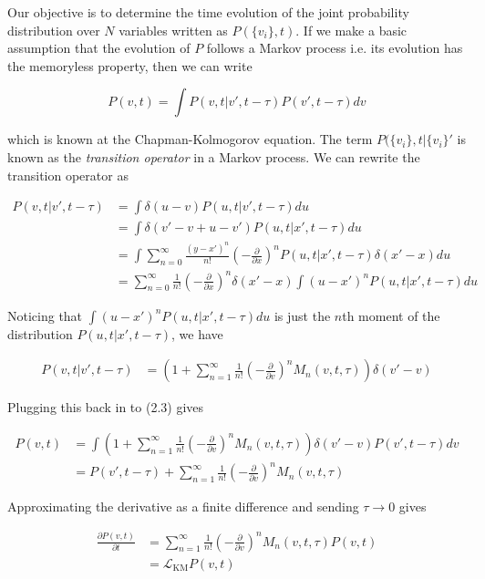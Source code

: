 \documentclass{ucetd}
\begin{document}
Our objective is to determine the time evolution of the joint probability distribution over $N$ variables written as $P(\{v_{i}\}, t)$. If we make a basic assumption that the evolution of $P$ follows a Markov process i.e. its evolution has the memoryless property, then we can write

\begin{equation}
P(v, t) = \int P(v, t | v', t-\tau)P(v', t-\tau)dv
\end{equation} 

which is known at the Chapman-Kolmogorov equation. The term $P(\{v_{i}\}, t | \{v_{i}\}'$ is known as the \emph{transition operator} in a Markov process. We can rewrite the transition operator as

\begin{align*}
P(v,t | v',t-\tau) &= \int \delta(u-v)P(u, t | v', t-\tau)du\\
&= \int \delta(v'-v+u-v')P(u, t | x', t-\tau)du\\
&= \int \sum_{n=0}^{\infty} \frac{(y-x')^{n}}{n!}\left(-\frac{\partial}{\partial x}\right)^{n}P(u, t | x', t-\tau)\delta(x'-x)du\\
&= \sum_{n=0}^{\infty} \frac{1}{n!}\left(-\frac{\partial}{\partial x}\right)^{n}
\delta(x'-x)\int(u-x')^{n}P(u, t | x', t-\tau)du
\end{align*} 

Noticing that $\int(u-x')^{n}P(u, t | x', t-\tau)du$ is just the $n$th moment of the distribution $P(u, t | x', t-\tau)$, we have 

\begin{align}
P(v,t | v',t-\tau) &= \left(1 + \sum_{n=1}^{\infty} \frac{1}{n!}\left(-\frac{\partial}{\partial v}\right)^{n} M_{n}(v,t,\tau)\right)\delta(v'-v)
\end{align} 

Plugging this back in to (2.3) gives 

\begin{align}
P(v, t) &= \int \left(1 + \sum_{n=1}^{\infty} \frac{1}{n!}\left(-\frac{\partial}{\partial v}\right)^{n} M_{n}(v,t,\tau)\right)\delta(v'-v)P(v', t-\tau)dv\\
&= P(v', t-\tau) + \sum_{n=1}^{\infty} \frac{1}{n!}\left(-\frac{\partial}{\partial v}\right)^{n} M_{n}(v,t,\tau)
\end{align} 

Approximating the derivative as a finite difference and sending $\tau \rightarrow 0$ gives

\begin{align}
\frac{\partial P(v,t)}{\partial t} &= \sum_{n=1}^{\infty} \frac{1}{n!}\left(-\frac{\partial}{\partial v}\right)^{n} M_{n}(v,t,\tau)P(v,t)\\
&= \mathcal{L}_{\mathrm{KM}} P(v,t)
\end{align} 
\end{document}
